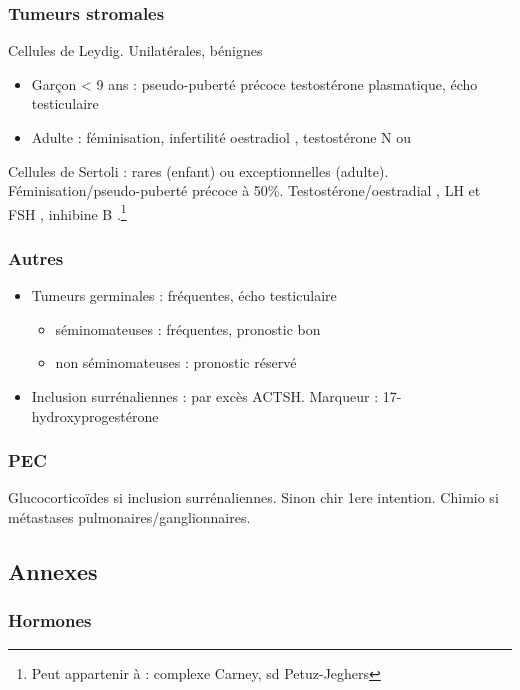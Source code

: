 \documentclass[11pt]{article}
\begin{document}
\subsubsection{Tumeurs stromales}
\label{sec:org19f5d80}
Cellules de Leydig. Unilatérales, bénignes
\begin{itemize}
\item Garçon < 9 ans : pseudo-puberté précoce \thus testostérone plasmatique, écho
testiculaire
\item Adulte : féminisation, infertilité \thus oestradiol \inc, testostérone N ou \dec
\end{itemize}

Cellules de Sertoli : rares (enfant) ou exceptionnelles
(adulte). Féminisation/pseudo-puberté précoce à 50\%. Testostérone/oestradial
\inc, LH et FSH \dec, inhibine B \inc.\footnote{Peut appartenir à : complexe Carney, sd Petuz-Jeghers}

\subsubsection{Autres}
\label{sec:org41b2e35}
\begin{itemize}
\item Tumeurs germinales : fréquentes, écho testiculaire
\begin{itemize}
\item séminomateuses : fréquentes, pronostic bon
\item non séminomateuses : pronostic réservé
\end{itemize}
\item Inclusion surrénaliennes : par excès ACTSH. Marqueur : 17-hydroxyprogestérone
\end{itemize}

\subsubsection{PEC}
\label{sec:org2d75297}
Glucocorticoïdes si inclusion surrénaliennes. Sinon chir 1ere intention. Chimio si métastases pulmonaires/ganglionnaires.


\subsection{Annexes}
\label{sec:org86b575d}
\subsubsection{Hormones}
\label{sec:orgeb64c0a}
\end{document}
